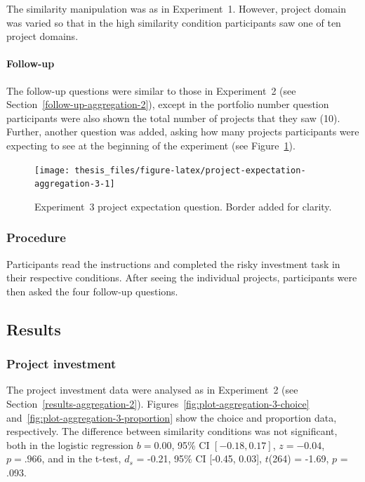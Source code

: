 \documentclass[a4paper, nobind, dvipsnames]{templates/ociamthesis}
\theoremstyle{definition}
\theoremstyle{definition}
\theoremstyle{definition}
\theoremstyle{definition}
\theoremstyle{remark}
\begin{document}
The similarity manipulation was as in Experiment~1. However, project domain was
varied so that in the high similarity condition participants saw one of ten
project domains.

\hypertarget{follow-up-aggregation-3}{%
\paragraph{Follow-up}\label{follow-up-aggregation-3}}

The follow-up questions were similar to those in Experiment~2 (see
Section~\ref{follow-up-aggregation-2}), except in the portfolio number question
participants were also shown the total number of projects that they saw (10).
Further, another question was added, asking how many projects participants were
expecting to see at the beginning of the experiment (see
Figure~\ref{fig:project-expectation-aggregation-3}).



\begin{figure}
\texttt{[image: thesis\_files/figure-latex/project-expectation-aggregation-3-1]} \caption{Experiment~3 project expectation question. Border added for clarity.}\label{fig:project-expectation-aggregation-3}
\end{figure}

\subsubsection{Procedure}

Participants read the instructions and completed the risky investment task in
their respective conditions. After seeing the individual projects, participants
were then asked the four follow-up questions.

\subsection{Results}

\subsubsection{Project investment}

The project investment data were analysed as in Experiment~2 (see
Section~\ref{results-aggregation-2}).
Figures~\ref{fig:plot-aggregation-3-choice}
and~\ref{fig:plot-aggregation-3-proportion} show the choice and proportion
data, respectively. The difference between similarity conditions was not
significant, both in the logistic regression
\(b = 0.00\), 95\% CI \([-0.18, 0.17]\), \(z = -0.04\), \(p = .966\), and in the t-test,
\(d_s\) = -0.21, 95\% CI {[}-0.45, 0.03{]}, \(t\)(264) = -1.69, \(p\) = .093.
\end{document}
